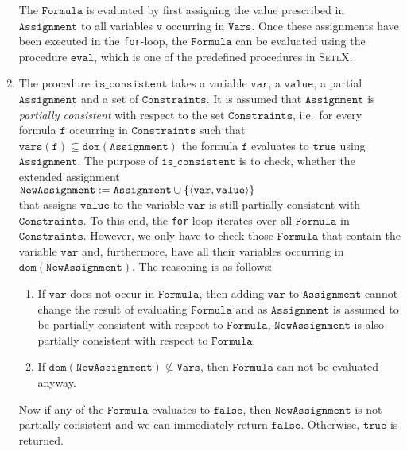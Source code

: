 \begin{enumerate}
      The $\mathtt{Formula}$ is evaluated by first assigning the value prescribed in $\mathtt{Assignment}$ to
      all variables $\mathtt{v}$ occurring in $\mathtt{Vars}$.  Once these assignments have been executed in
      the \texttt{for}-loop, the $\mathtt{Formula}$ can be evaluated using the procedure $\mathtt{eval}$, which
      is one of the predefined procedures in \textsc{SetlX}.
\item The procedure $\mathtt{is\_consistent}$ takes a variable $\mathtt{var}$, a $\mathtt{value}$, a partial 
      $\mathtt{Assignment}$ and a set of $\mathtt{Constraints}$.  It is assumed that $\mathtt{Assignment}$ is
      \emph{\color{blue}partially consistent} with respect to the set $\mathtt{Constraints}$, i.e.~for every formula $\mathtt{f}$
      occurring in $\mathtt{Constraints}$ such that $\mathtt{vars}(\mathtt{f}) \subseteq \mathtt{dom}(\mathtt{Assignment})$
      the formula $\mathtt{f}$ evaluates to $\mathtt{true}$ using $\mathtt{Assignment}$.  The purpose of
      $\mathtt{is\_consistent}$ is to check, whether the extended assignment
      \\[0.2cm]
      \hspace*{1.3cm}
      $\mathtt{NewAssignment} \;\mathtt{:=}\;\mathtt{Assignment} \cup \{ \pair(\mathtt{var}, \mathtt{value}) \}$
      \\[0.2cm]
      that assigns $\mathtt{value}$ to the variable $\mathtt{var}$ is still partially consistent with $\mathtt{Constraints}$. 
      To this end, the \texttt{for}-loop iterates over all $\mathtt{Formula}$ in $\mathtt{Constraints}$. 
      However, we only have to check those $\mathtt{Formula}$ that contain the variable $\mathtt{var}$ and,
      furthermore, have all their variables occurring in $\mathtt{dom}(\mathtt{NewAssignment})$.  The reasoning
      is as follows:
      \begin{enumerate}
      \item If $\mathtt{var}$ does not occur in $\mathtt{Formula}$, then adding $\mathtt{var}$ to
            $\mathtt{Assignment}$ cannot change the result of evaluating $\mathtt{Formula}$ and as
            $\mathtt{Assignment}$ is assumed to be partially consistent with respect to $\mathtt{Formula}$, 
            $\mathtt{NewAssignment}$ is also partially consistent with respect to $\mathtt{Formula}$.
      \item If $\mathtt{dom}(\mathtt{NewAssignment}) \not\subseteq \mathtt{Vars}$, then $\mathtt{Formula}$ can not be evaluated anyway.
      \end{enumerate}
      Now if any of the $\mathtt{Formula}$ evaluates to $\mathtt{false}$, then $\mathtt{NewAssignment}$ is not
      partially consistent and we can immediately return $\mathtt{false}$.  Otherwise, $\mathtt{true}$ is returned.
\end{enumerate}  

